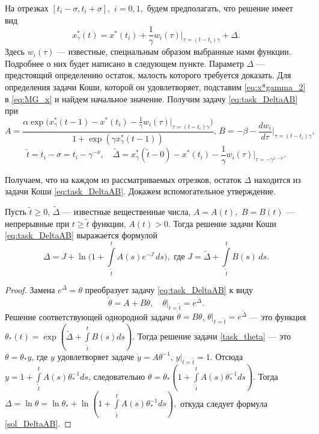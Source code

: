На отрезках $[t_i - \sigma, t_i + \sigma],$ $i=0, 1,$ будем предполагать, что решение имеет вид
%
\begin{equation}
    \label{eq:x*gamma_2}
    x^*_\gamma(t) = x^*(t_i) + \frac{1}{\gamma}w_i(\tau)|_{\tau=(t-t_i)\gamma} + \Delta.
\end{equation}
%
Здесь $w_i(\tau)$ --- известные, специальным образом выбранные нами функции. Подробнее о них будет написано в следующем пункте. Параметр $\Delta$ --- предстоящий определению остаток, малость которого требуется доказать. Для определения задачи Коши, которой он удовлетворяет, подставим \eqref{eq:x*gamma_2} в \eqref{eq:MG_x} и найдем начальное значение. Получим задачу \eqref{eq:task_DeltaAB} при
\begin{equation}
    \label{AB_eq:x*gamma_2}
    A=\frac{\alpha\exp\big(x_{\gamma}^*(t-1)-x^*(t_i)-\frac{1}{\gamma}w_i(\tau)|_{\tau=(t-t_i)\gamma}\big)}{1+\exp(\gamma x_{\gamma}^*(t-1))},
    \,
    B=-\beta-\frac{dw_i}{d\tau}\Big|_{\tau=(t - t_i)\gamma},
\end{equation}
%
\begin{equation}\label{tilde_eq:x*gamma_2}
    \tilde{t} = t_i - \sigma = t_i - \gamma^{-\nu},\quad \tilde{\Delta}=x_{\gamma}^*(\tilde{t} - 0) - x^*(t_i) -\frac{1}{\gamma} w_i(\tau)|_{\tau = -\gamma^{1 - \nu}}.
\end{equation}

Получаем, что на каждом из рассматриваемых отрезков, остаток $\Delta$ находится из задачи Коши \eqref{eq:task_DeltaAB}. Докажем вспомогательное утверждение.

\begin{lemma}\label{lm:DeltaAB}
Пусть $\tilde{t} \geqslant 0$, $\tilde{\Delta}$ --- известные вещественные числа, $A = A(t),$ $B = B(t)$ --- непрерывные при $t \geq \tilde{t}$ функции, $A(t) > 0$. Тогда решение задачи Коши \eqref{eq:task_DeltaAB} выражается формулой
	\begin{equation}\label{sol_DeltaAB}
	\Delta = J + \ln\Big(1 + \int\limits_{\tilde{t}}^{t} A(s) e^{-J}\,ds \Big),
	\text{ где } J = \tilde{\Delta} + \int\limits_{\tilde{t}}^{t} B(s)\,ds.
	\end{equation}
\end{lemma}
\begin{proof}
    Замена $e^{\Delta}=\theta$ преобразует задачу \eqref{eq:task_DeltaAB} к виду
    \begin{equation}\label{task_theta}
		\dot{\theta}=A+B\theta,\quad\theta|_{t=\tilde{t}}=e^{\tilde{\Delta}}.
    \end{equation}
    Решение соответствующей однородной задачи $\dot{\theta}=B\theta$, $\theta|_{t=\tilde{t}}=e^{\tilde{\Delta}}$ --- это функция $\theta_*(t)=\exp(\tilde{\Delta}+\int\limits_{\tilde{t}}^{t}B(s)ds).$ Тогда решение задачи \eqref{task_theta} --- это $\theta=\theta_* y$, где $y$ удовлетворяет задаче $\dot{y} = A \theta^{-1}$, $y|_{t=\tilde{t}} = 1$. Отсюда $y = 1 + \int\limits_{\tilde{t}}^{t}A(s)\theta_*^{-1}ds$, следовательно $\theta=\theta_*(1+\int\limits_{\tilde{t}}^{t}A(s)\theta_*^{-1}ds)$.
    Тогда $\Delta=\ln\theta=\ln\theta_*+\ln(1+\int\limits_{\tilde{t}}^{t}A(s)\theta_*^{-1}ds),$ откуда следует формула \eqref{sol_DeltaAB}.
\end{proof}

